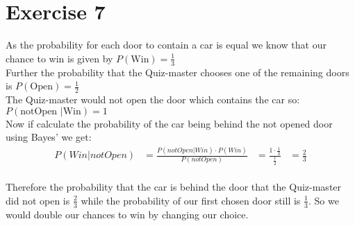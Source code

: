 \documentclass{article}
\begin{document}
\setcounter{equation}{0}
\section*{Exercise 7}

As the probability for each door to contain a car is equal we know that our chance to win is given by $P(\mbox{Win}) = \frac{1} 3$\\
Further the probability that the Quiz-master chooses one of the remaining doors is
$P(\mbox{Open}) = \frac{1} 2$\\
The Quiz-master would not open the door which contains the car so: \\
$P(\mbox{notOpen }|\mbox{Win}) = 1$\\
Now if calculate the probability of the car being behind the not opened door using Bayes' we get:
\begin{align}
& & P(Win|notOpen) & = \frac{P(notOpen|Win) \cdot P(Win)}{P(notOpen)} & = \frac{1 \cdot \frac{1}{3}}{\frac{1}{2}} &= \frac{2}{3}& &
\end{align}
\\
Therefore the probability that the car is behind the door that the Quiz-master did not open is $\frac{2}{3}$ while the probability of our first chosen door still is $\frac{1}{3}$. So we would double our chances to win by changing our choice.
\end{document}
